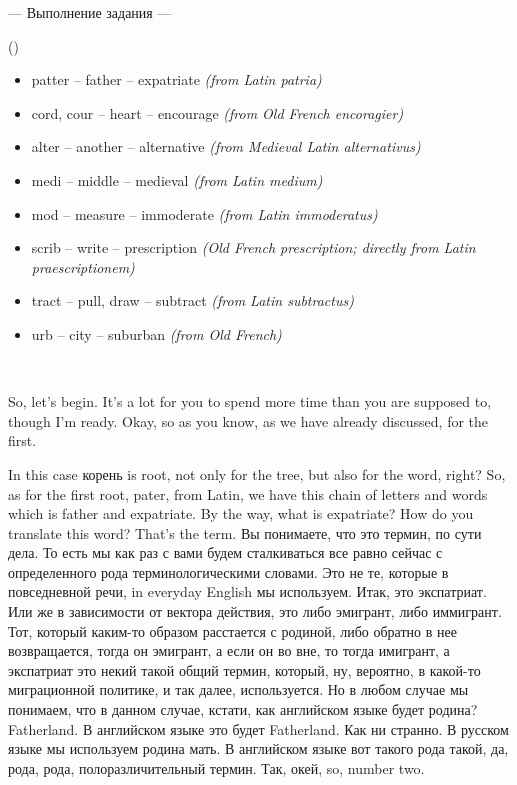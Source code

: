 \documentclass[main.tex]{subfiles}
\begin{document}
\hypertarget{ltask:2023-11-22-1}{--- Выполнение задания ---} (\hyperref[task:2023-11-22]{\color{blue}{перейти к тексту задания}})
\\


\begin{itemize}[nosep,leftmargin=*,label={}]
	\itemsep\eitsp
	\item patter -- father -- expatriate \textit{(from Latin patria)}
	\item cord, cour -- heart -- encourage \textit{(from Old French encoragier)}
	\item alter -- another -- alternative \textit{(from Medieval Latin alternativus)}
	\item medi -- middle -- medieval \textit{(from Latin medium)}
	\item mod -- measure -- immoderate \textit{(from Latin immoderatus)}
	\item scrib -- write -- prescription \textit{(Old French prescription; directly from Latin praescriptionem)}
	\item tract -- pull, draw -- subtract \textit{(from Latin subtractus)}
	\item urb -- city -- suburban \textit{(from Old French)}
\end{itemize}
\ 

So, let's begin.
It's a lot for you to spend more time than you are supposed to, though I'm ready.
Okay, so as you know, as we have already discussed, for the first.

In this case корень is root, not only for the tree, but also for the word, right?
So, as for the first root, pater, from Latin, we have this chain of letters and words which is father and expatriate.
By the way, what is expatriate? How do you translate this word? That's the term.
Вы понимаете, что это термин, по сути дела.
То есть мы как раз с вами будем сталкиваться все равно сейчас с определенного рода терминологическими словами.
Это не те, которые в повседневной речи, in everyday English мы используем.
Итак, это экспатриат.
Или же в зависимости от вектора действия, это либо эмигрант, либо иммигрант.
Тот, который каким-то образом расстается с родиной, либо обратно в нее возвращается, тогда он эмигрант, а если он во вне, то тогда имигрант, а экспатриат это некий такой общий термин, который, ну, вероятно, в какой-то миграционной политике, и так далее, используется.
Но в любом случае мы понимаем, что в данном случае, кстати, как английском языке будет родина? Fatherland.
В английском языке это будет Fatherland.
Как ни странно.
В русском языке мы используем родина мать.
В английском языке вот такого рода такой, да, рода, рода, полоразличительный термин.
Так, окей, so, number two.
\end{document}
